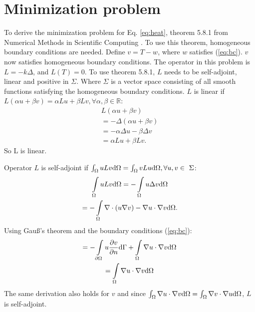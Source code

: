 \section{Minimization problem}
To derive the minimization problem for Eq. \ref{eq:heat}, theorem 5.8.1 from Numerical Methods in Scientific Computing \cite{kan}. To use this theorem, homogeneous boundary conditions are needed. Define $v=T-w$, where $w$ satisfies (\ref{eq:bc}). $v$ now satisfies homogeneous boundary conditions. The operator in this problem is $L=-k\Delta$, and $L(T)=0$. To use theorem 5.8.1, $L$ needs to be self-adjoint, linear and positive in $\Sigma$. Where $\Sigma$ is a vector space consisting of all smooth functions satisfying the homogeneous boundary conditions. $L$ is linear if $L(\alpha u+\beta v)=\alpha Lu+\beta Lv, \forall\alpha,\beta\in\mathbb{R}$:
\begin{gather*}
    L(\alpha u+\beta v)\\
    =-\Delta(\alpha u + \beta v)\\
    =-\alpha\Delta u-\beta \Delta v\\
    = \alpha Lu+\beta Lv.
\end{gather*}So L is linear.

Operator $L$ is self-adjoint if $\int\displaylimits_\Omega uLv \mathrm{d}\Omega=\int\displaylimits_\Omega vLu \mathrm{d}\Omega, \forall u,v\in~\Sigma$:
\begin{gather*}
    \int\displaylimits_\Omega uLv \mathrm{d}\Omega = -\int\displaylimits_\Omega u\Delta v \mathrm{d}\Omega\\
    =-\int\displaylimits_\Omega \nabla \cdot (u\nabla v) - \nabla u\cdot\nabla v \mathrm{d}\Omega.
\end{gather*}
Using Gau\ss's theorem and the boundary conditions (\ref{eq:bc}):
\begin{gather*}
    =-\int\displaylimits_{\partial\Omega} u\frac{\partial v}{\partial n} \mathrm{d}\Gamma + \int\displaylimits_\Omega \nabla u\cdot\nabla v \mathrm{d}\Omega\\
    =\int\displaylimits_\Omega \nabla u\cdot \nabla v\mathrm{d}\Omega
\end{gather*}
The same derivation also holds for $v$ and since $\int\displaylimits_\Omega \nabla u\cdot \nabla v \mathrm{d}\Omega = \int\displaylimits_\Omega \nabla v\cdot \nabla u \mathrm{d}\Omega$, $L$ is self-adjoint.


